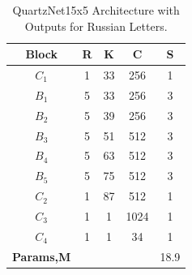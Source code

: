 \documentclass[a4paper]{article}
\begin{document}
\begin{table}[t]
  \caption{QuartzNet15x5 Architecture with Outputs for Russian Letters. }
  \label{tabular:Quartznet}
  \centering
  \begin{tabular}{ccccc}
    \toprule
    \textbf{Block}  & \textbf{R} & \textbf{K} & \textbf{C} & \textbf{S}     \\
    \midrule
    $C_1$  & 1 & 33 & 256 &  1  \\
    \midrule
    $B_1$  & 5 & 33 & 256 &  3  \\
    $B_2$  & 5 & 39 & 256 &  3  \\
    $B_3$  & 5 & 51 & 512 &  3  \\
    $B_4$  & 5 & 63 & 512 &  3  \\
    $B_5$  & 5 & 75 & 512 &  3  \\
    \midrule
    $C_2$  & 1 & 87 & 512 &  1  \\
    $C_3$  & 1 & 1 & 1024 &  1  \\
    $C_4$  & 1 & 1 & 34 &  1    \\
    \bottomrule
    \textbf{Params,M}  &  &  & &  18.9     \\
  \end{tabular}
\end{table}

\end{document}
